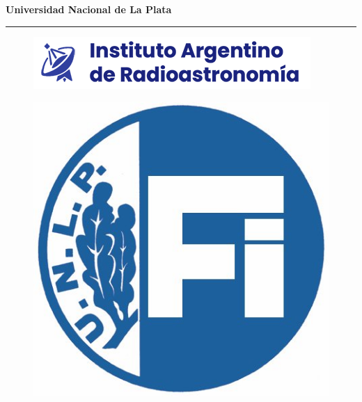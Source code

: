 \graphicspath{{portada}}
\begin{titlepage} 
\vspace*{-20mm}
\begin{center}
{	
 \bf{\fontsize{20}{0}\selectfont Universidad Nacional de La Plata }\\[-5mm]
 \rule[-2mm]{1\linewidth}{1mm}	
}
\end{center}
\vspace{-5mm}
\begin{figure}[ht!]
	\centering
	\includegraphics{portada/Iar-copia} 
\end{figure}

\vspace{-5mm}
\begin{figure}[ht!]
\centering
\includegraphics[scale=0.7]{portada/fac_ingenieria}
\end{figure}
 
{
 \centering \textbf{\fontsize{15}{0}{\selectfont{Facultad de ingeniería}}}\\[2mm]
 \textbf{\fontsize{15}{0}{\selectfont{Departamento de electrotecnia}}}\\[2mm]
 \begin{center} \textbf{\fontsize{15}{0}{\selectfont{Cátedra de trabajo final}}}
 \end{center}	
}


\end{titlepage}
